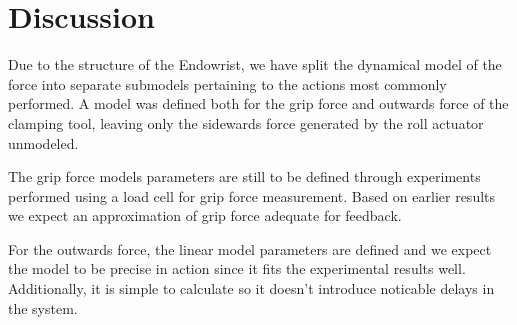 \section{Discussion}
Due to the structure of the Endowrist, we have split the dynamical model of the force into separate submodels pertaining to the actions most commonly performed.
A model was defined both for the grip force and outwards force of the clamping tool, leaving only the sidewards force generated by the roll actuator unmodeled.

The grip force models parameters are still to be defined through experiments performed using a load cell for grip force measurement.
Based on earlier results \cite{kim2014dynamic} we expect an approximation of grip force adequate for feedback.

For the outwards force, the linear model parameters are defined and we expect the model to be precise in action since it fits the experimental results well.
Additionally, it is simple to calculate so it doesn't introduce noticable delays in the system.